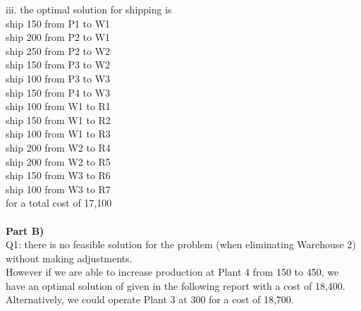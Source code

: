 iii.  the optimal solution for shipping is\\
ship 150 from P1 to W1\\
ship 200 from P2 to W1\\
ship 250 from P2 to W2\\
ship 150 from P3 to W2\\
ship 100 from P3 to W3\\
ship 150 from P4 to W3\\
ship 100 from W1 to R1\\
ship 150 from W1 to R2\\
ship 100 from W1 to R3\\
ship 200 from W2 to R4\\
ship 200 from W2 to R5\\
ship 150 from W3 to R6\\
ship 100 from W3 to R7\\
for a total cost of 17,100\\
\\

\textbf{Part B)}\\
Q1: there is no feasible solution for the problem (when eliminating Warehouse 2) without making adjustments.\\
However if we are able to increase production at Plant 4 from 150 to 450, we have an optimal solution of 
given in the following report with a cost of 18,400.  Alternatively, we could operate Plant 3 at 300 for a cost of 18,700.\\


